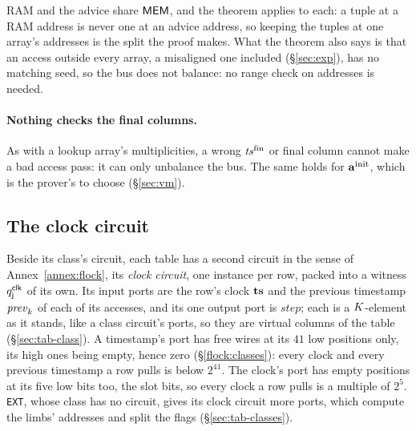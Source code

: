 RAM and the advice share $\mathsf{MEM}$, and the theorem applies to each: a tuple at a RAM address is never one at an advice address, so keeping the tuples at one array's addresses is the split the proof makes. What the theorem also says is that an access outside every array, a misaligned one included (\S\ref{sec:exp}), has no matching seed, so the bus does not balance: no range check on addresses is needed.

\paragraph{Nothing checks the final columns.} As with a lookup array's multiplicities, a wrong $\mathit{ts}^{\mathrm{fin}}$ or final column cannot make a bad access pass: it can only unbalance the bus. The same holds for $\mathbf{a}^{\mathrm{init}}$, which is the prover's to choose (\S\ref{sec:vm}).

\subsection{The clock circuit}\label{sec:clock}

Beside its class's circuit, each table has a second circuit in the sense of Annex~\ref{annex:flock}, its \emph{clock circuit}, one instance per row, packed into a witness $q^{\mathsf{clk}}_{\mathsf{j}}$ of its own. Its input ports are the row's clock $\mathbf{ts}$ and the previous timestamp $\mathit{prev}_k$ of each of its accesses, and its one output port is $\mathit{step}$; each is a $K$-element as it stands, like a class circuit's ports, so they are virtual columns of the table (\S\ref{sec:tab-class}). A timestamp's port has free wires at its $41$ low positions only, its high ones being empty, hence zero (\S\ref{flock:classes}): every clock and every previous timestamp a row pulls is below $2^{41}$. The clock's port has empty positions at its five low bits too, the slot bits, so every clock a row pulls is a multiple of $2^{5}$. \texttt{EXT}, whose class has no circuit, gives its clock circuit more ports, which compute the limbs' addresses and split the flags (\S\ref{sec:tab-classes}).


